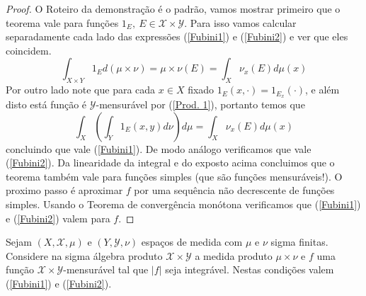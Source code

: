 \begin{proof}
O Roteiro da demonstração é o padrão, vamos mostrar primeiro que o teorema vale para funções $1_E,~E\in \mathscr{X}\times \mathscr{Y}$. Para isso vamos calcular separadamente cada lado das expressões (\ref{Fubini1}) e (\ref{Fubini2}) e ver que eles coincidem.
\begin{equation}
\int_{X\times Y} 1_E d(\mu\times \nu)=\mu\times \nu( E)=\int_X \nu_x(E) d\mu(x)
\end{equation}
Por outro lado note que para cada $x\in X$ fixado $1_E(x,\cdot)=1_{E_x}(\cdot)$, e além disto está função é $\mathscr{Y}$-mensurável por (\ref{Prod. 1}),  portanto temos que 
\begin{equation}
\int_X(\int_Y 1_E(x,y) d\nu)d\mu= \int_X \nu_x(E) d\mu(x)
\end{equation}
concluindo que vale (\ref{Fubini1}). De modo análogo verificamos que vale (\ref{Fubini2}). Da linearidade da integral e do exposto acima 
concluimos que o teorema também vale para funções simples (que são funções mensuráveis!). O proximo passo é aproximar $f$ por uma sequência
não decrescente de funções simples. Usando o Teorema de convergência monótona verificamos que  (\ref{Fubini1}) e (\ref{Fubini2}) valem para $f$.
\end{proof}




\begin{corolario}[Fubini]
Sejam $(X, \mathscr{X}, \mu)$ e $(Y, \mathscr{Y}, \nu)$
espaços de medida com $\mu$ e $\nu$ sigma finitas. Considere na sigma álgebra
produto $\mathscr{X}\times \mathscr{Y}$ a medida produto $\mu\times \nu$ e $f$ uma função $\mathscr{X}\times \mathscr{Y}$-mensurável tal que 
$|f|$ seja integrável. Nestas condições valem (\ref{Fubini1}) e (\ref{Fubini2}). 
\end{corolario}

